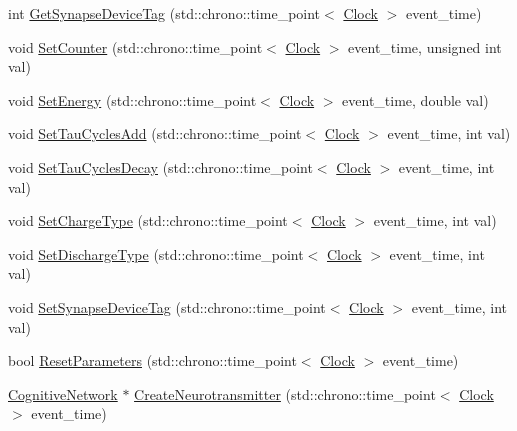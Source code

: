 \begin{DoxyCompactItemize}
\item 
int \mbox{\hyperlink{classSynapse_a4fe6b49e46ebda6f34593d3df54d5593}{Get\+Synapse\+Device\+Tag}} (std\+::chrono\+::time\+\_\+point$<$ \mbox{\hyperlink{universe_8h_a0ef8d951d1ca5ab3cfaf7ab4c7a6fd80}{Clock}} $>$ event\+\_\+time)
\item 
void \mbox{\hyperlink{classSynapse_aa1a990a7b89fbeaf1109a8b70d86111b}{Set\+Counter}} (std\+::chrono\+::time\+\_\+point$<$ \mbox{\hyperlink{universe_8h_a0ef8d951d1ca5ab3cfaf7ab4c7a6fd80}{Clock}} $>$ event\+\_\+time, unsigned int val)
\item 
void \mbox{\hyperlink{classSynapse_aa90b66763c8aca2ad8df535ffed5d4a9}{Set\+Energy}} (std\+::chrono\+::time\+\_\+point$<$ \mbox{\hyperlink{universe_8h_a0ef8d951d1ca5ab3cfaf7ab4c7a6fd80}{Clock}} $>$ event\+\_\+time, double val)
\item 
void \mbox{\hyperlink{classSynapse_afbd7a2e7e6353b3e743ec100fe615e84}{Set\+Tau\+Cycles\+Add}} (std\+::chrono\+::time\+\_\+point$<$ \mbox{\hyperlink{universe_8h_a0ef8d951d1ca5ab3cfaf7ab4c7a6fd80}{Clock}} $>$ event\+\_\+time, int val)
\item 
void \mbox{\hyperlink{classSynapse_a5bbee6bb7dc49c90b7c3413d02e06cc8}{Set\+Tau\+Cycles\+Decay}} (std\+::chrono\+::time\+\_\+point$<$ \mbox{\hyperlink{universe_8h_a0ef8d951d1ca5ab3cfaf7ab4c7a6fd80}{Clock}} $>$ event\+\_\+time, int val)
\item 
void \mbox{\hyperlink{classSynapse_a87fb31c2758d8fc26e8f2cf4fd7d1af5}{Set\+Charge\+Type}} (std\+::chrono\+::time\+\_\+point$<$ \mbox{\hyperlink{universe_8h_a0ef8d951d1ca5ab3cfaf7ab4c7a6fd80}{Clock}} $>$ event\+\_\+time, int val)
\item 
void \mbox{\hyperlink{classSynapse_a1956d553c15fa1aea12d39725baeca1b}{Set\+Discharge\+Type}} (std\+::chrono\+::time\+\_\+point$<$ \mbox{\hyperlink{universe_8h_a0ef8d951d1ca5ab3cfaf7ab4c7a6fd80}{Clock}} $>$ event\+\_\+time, int val)
\item 
void \mbox{\hyperlink{classSynapse_a702c08b1ee4389382a5890d8c19aee9c}{Set\+Synapse\+Device\+Tag}} (std\+::chrono\+::time\+\_\+point$<$ \mbox{\hyperlink{universe_8h_a0ef8d951d1ca5ab3cfaf7ab4c7a6fd80}{Clock}} $>$ event\+\_\+time, int val)
\item 
bool \mbox{\hyperlink{classSynapse_a5b2bbc3553e92492a5c38d1d797fcd92}{Reset\+Parameters}} (std\+::chrono\+::time\+\_\+point$<$ \mbox{\hyperlink{universe_8h_a0ef8d951d1ca5ab3cfaf7ab4c7a6fd80}{Clock}} $>$ event\+\_\+time)
\item 
\mbox{\hyperlink{classCognitiveNetwork}{Cognitive\+Network}} $\ast$ \mbox{\hyperlink{classSynapse_aef4c17534bc93b31de8e81c1ad138b7b}{Create\+Neurotransmitter}} (std\+::chrono\+::time\+\_\+point$<$ \mbox{\hyperlink{universe_8h_a0ef8d951d1ca5ab3cfaf7ab4c7a6fd80}{Clock}} $>$ event\+\_\+time)

\end{DoxyCompactItemize}
